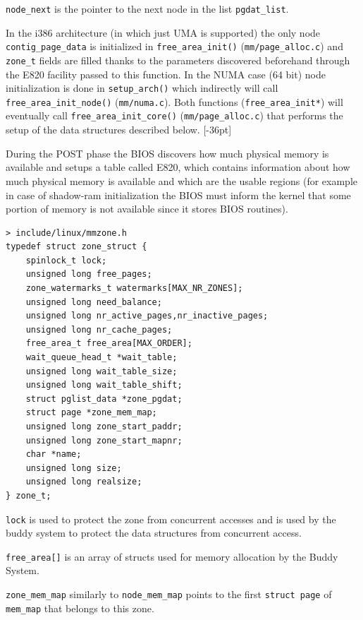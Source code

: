 \documentclass[twoside]{article}
\begin{document}
\texttt{node_next} is the pointer to the next node in the list
\texttt{pgdat_list}.

In the i386 architecture (in which just UMA is supported) the only node
\texttt{contig_page_data} is initialized in \texttt{free_area_init()}
(\texttt{mm/page_alloc.c}) and \texttt{zone_t} fields are filled thanks to the
parameters discovered beforehand through the E820 facility passed to this
function. In the NUMA case (64 bit) node initialization is done in \texttt{setup_arch()} which
indirectly will call \texttt{free_area_init_node()} (\texttt{mm/numa.c}). Both
functions (\texttt{free_area_init*}) will eventually call
\texttt{free_area_init_core()} (\texttt{mm/page_alloc.c}) that performs the
setup of the data structures described below.
[-36pt]

During the POST phase the BIOS discovers how much physical memory is
available and setups a table called E820, which contains information about how
much physical memory is available and which are the usable regions
(for example in case of shadow-ram initialization the BIOS must inform the
kernel that some portion of memory is not available since it stores BIOS
routines).

\newpage

\begin{verbatim}
> include/linux/mmzone.h
typedef struct zone_struct {
    spinlock_t lock;
    unsigned long free_pages;
    zone_watermarks_t watermarks[MAX_NR_ZONES];
    unsigned long need_balance;
    unsigned long nr_active_pages,nr_inactive_pages;
    unsigned long nr_cache_pages;
    free_area_t free_area[MAX_ORDER];
    wait_queue_head_t *wait_table;
    unsigned long wait_table_size;
    unsigned long wait_table_shift;
    struct pglist_data *zone_pgdat;
    struct page *zone_mem_map;
    unsigned long zone_start_paddr;
    unsigned long zone_start_mapnr;
    char *name;
    unsigned long size;
    unsigned long realsize;
} zone_t;
\end{verbatim}

\texttt{lock} is used to protect the zone from concurrent accesses and is used
by the buddy system to protect the data structures from concurrent access.

\texttt{free_area[]} is an array of structs used for memory allocation by the
Buddy System.

\texttt{zone_mem_map} similarly to \texttt{node_mem_map} points to the first
\texttt{struct page} of \texttt{mem_map} that belongs to this zone.
\end{document}
